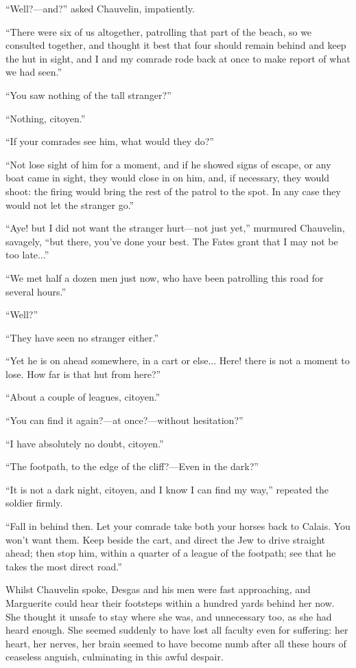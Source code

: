 \documentclass[paper=5.5in:8.5in,BCOR=7mm,twoside,DIV=calc,12pt,usegeometry,chapterprefix,endperiod,headings=big]{scrbook}
\begin{document}
\enquote{Well?---and?} asked Chauvelin, impatiently.

\enquote{There were six of us altogether, patrolling that part of the beach, so we consulted together, and thought it best that four should remain behind and keep the hut in sight, and I and my comrade rode back at once to make report of what we had seen.}

\enquote{You saw nothing of the tall stranger?}

\enquote{Nothing, citoyen.}

\enquote{If your comrades see him, what would they do?}

\enquote{Not lose sight of him for a moment, and if he showed signs of escape, or any boat came in sight, they would close in on him, and, if necessary, they would shoot: the firing would bring the rest of the patrol to the spot. In any case they would not let the stranger go.}

\enquote{Aye! but I did not want the stranger hurt---not just yet,} murmured Chauvelin, savagely, \enquote{but there, you've done your best. The Fates grant that I may not be too late...}

\enquote{We met half a dozen men just now, who have been patrolling this road for several hours.}

\enquote{Well?}

\enquote{They have seen no stranger either.}

\enquote{Yet he is on ahead somewhere, in a cart or else... Here! there is not a moment to lose. How far is that hut from here?}

\enquote{About a couple of leagues, citoyen.}

\enquote{You can find it again?---at once?---without hesitation?}

\enquote{I have absolutely no doubt, citoyen.}

\enquote{The footpath, to the edge of the cliff?---Even in the dark?}

\enquote{It is not a dark night, citoyen, and I know I can find my way,} repeated the soldier firmly.

\enquote{Fall in behind then. Let your comrade take both your horses back to Calais. You won't want them. Keep beside the cart, and direct the Jew to drive straight ahead; then stop him, within a quarter of a league of the footpath; see that he takes the most direct road.}

Whilst Chauvelin spoke, Desgas and his men were fast approaching, and Marguerite could hear their footsteps within a hundred yards behind her now. She thought it unsafe to stay where she was, and unnecessary too, as she had heard enough. She seemed suddenly to have lost all faculty even for suffering: her heart, her nerves, her brain seemed to have become numb after all these hours of ceaseless anguish, culminating in this awful despair.
\end{document}
